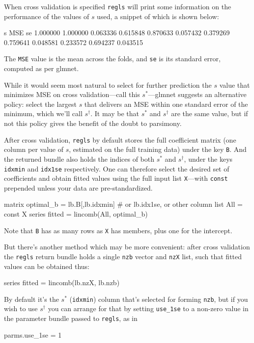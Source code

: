 \documentclass{article}
\begin{document}
When cross validation is specified \texttt{regls} will print some
information on the performance of the values of $s$ used, a
snippet of which is shown below:
\begin{code}
          s        MSE         se
   1.000000   1.000000   0.063336
   0.615848   0.870633   0.057432
   0.379269   0.759641   0.048581
   0.233572   0.694237   0.043515
\end{code}
%
The \texttt{MSE} value is the mean across the folds, and \texttt{se}
is its standard error, computed as per \textsf{glmnet}.

While it would seem most natural to select for further prediction the
$s$ value that minimizes MSE on cross validation---call this
$s^*$---\textsf{glmnet} suggests an alternative policy: select the
largest $s$ that delivers an MSE within one standard error of the
minimum, which we'll call $s^{\dagger}$. It may be that $s^*$ and
$s^{\dagger}$ are the same value, but if not this policy gives the
benefit of the doubt to parsimony.

After cross validation, \texttt{regls} by default stores the full
coefficient matrix (one column per value of $s$, estimated on the full
training data) under the key \texttt{B}.  And the returned bundle also
holds the indices of both $s^*$ and $s^{\dagger}$, under the keys
\texttt{idxmin} and \texttt{idx1se} respectively. One can therefore
select the desired set of coefficients and obtain fitted values using
the full input list \texttt{X}---with \texttt{const} prepended unless
your data are pre-standardized.
\begin{code}
matrix optimal_b = lb.B[,lb.idxmin] # or lb.idx1se, or other column
list All = const X
series fitted = lincomb(All, optimal_b)
\end{code}
Note that \texttt{B} has as many rows as \texttt{X} has members, plus
one for the intercept.

But there's another method which may be more convenient: after cross
validation the \texttt{regls} return bundle holds a single
\texttt{nzb} vector and \texttt{nzX} list, such that fitted values can
be obtained thus:
\begin{code}
series fitted = lincomb(lb.nzX, lb.nzb)
\end{code}
By default it's the $s^*$ (\texttt{idxmin}) column that's selected for
forming \texttt{nzb}, but if you wish to use $s^{\dagger}$ you can
arrange for that by setting \texttt{use\_1se} to a non-zero value in
the parameter bundle passed to \texttt{regls}, as in
\begin{code}
parms.use_1se = 1
\end{code}
\end{document}
